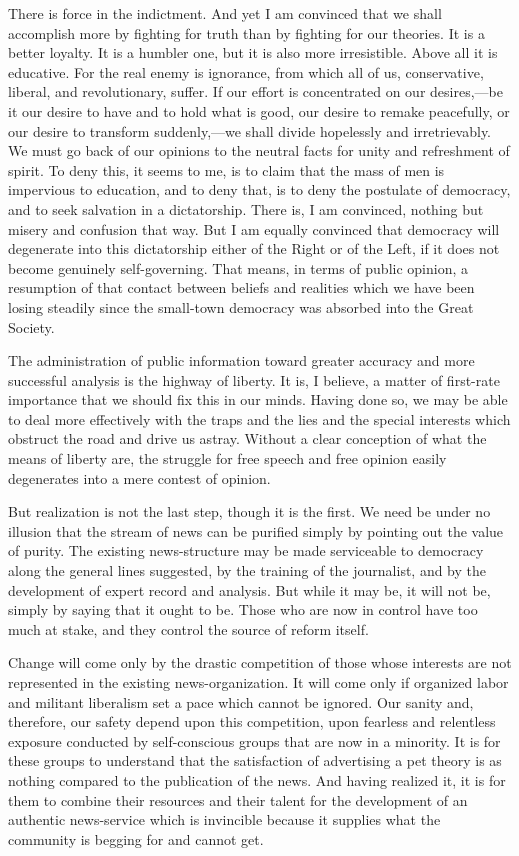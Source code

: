 \documentclass[openany,nobib,twoside,nohyper]{tufte-book}
\begin{document}
There is force in the indictment. And yet I am convinced that we shall
accomplish more by fighting for truth than by fighting for our theories.
It is a better loyalty. It is a humbler one, but it is also more
irresistible. Above all it is educative. For the real enemy is
ignorance, from which all of us, conservative, liberal, and
revolutionary, suffer. If our effort is concentrated on our
desires,---be it our desire to have and to hold what is good, our desire
to remake peacefully, or our desire to transform suddenly,---we shall
divide hopelessly and irretrievably. We must go back of our opinions to
the neutral facts for unity and refreshment of spirit. To deny this, it
seems to me, is to claim that the mass of men is impervious to
education, and to deny that, is to deny the postulate of democracy, and
to seek salvation in a dictatorship. There is, I am convinced, nothing
but misery and confusion that way. But I am equally convinced that
democracy will degenerate into this dictatorship either of the Right or
of the Left, if it does not become genuinely self-governing. That means,
in terms of public opinion, a resumption of that contact between beliefs
and realities which we have been losing steadily since the small-town
democracy was absorbed into the Great Society.

The administration of public information toward greater accuracy and
more successful analysis is the highway of liberty. It is, I believe, a
matter of first-rate importance that we should fix this in our minds.
Having done so, we may be able to deal more effectively with the traps
and the lies and the special interests which obstruct the road and drive
us astray. Without a clear conception of what the means of liberty are,
the struggle for free speech and free opinion easily degenerates into a
mere contest of opinion.

But realization is not the last step, though it is the first. We need be
under no illusion that the stream of news can be purified simply by
pointing out the value of purity. The existing news-structure may be
made serviceable to democracy along the general lines suggested, by the
training of the journalist, and by the development of expert record and
analysis. But while it may be, it will not be, simply by saying that it
ought to be. Those who are now in control have too much at stake, and
they control the source of reform itself.

Change will come only by the drastic competition of those whose
interests are not represented in the existing news-organization. It will
come only if organized labor and militant liberalism set a pace which
cannot be ignored. Our sanity and, therefore, our safety depend upon
this competition, upon fearless and relentless exposure conducted by
self-conscious groups that are now in a minority. It is for these groups
to understand that the satisfaction of advertising a pet theory is as
nothing compared to the publication of the news. And having realized it,
it is for them to combine their resources and their talent for the
development of an authentic news-service which is invincible because it
supplies what the community is begging for and cannot get.
\end{document}

